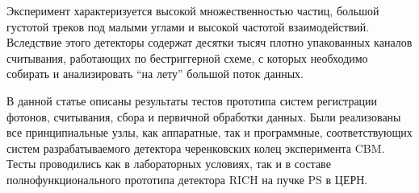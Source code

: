 Эксперимент характеризуется высокой множественностью частиц, большой густотой треков под малыми углами и высокой частотой взаимодействий. Вследствие этого детекторы содержат десятки тысяч плотно упакованных каналов считывания, работающих по бестриггерной схеме, с которых необходимо собирать и анализировать ``на лету'' большой поток данных.

В данной статье описаны результаты тестов прототипа систем регистрации фотонов, считывания, сбора и первичной обработки данных. Были реализованы все принципиальные узлы, как аппаратные, так и программные, соответствующих систем разрабатываемого детектора черенковских колец эксперимента CBM. Тесты проводились как в лабораторных условиях, так и в составе полнофункционального прототипа детектора RICH на пучке PS в ЦЕРН.
